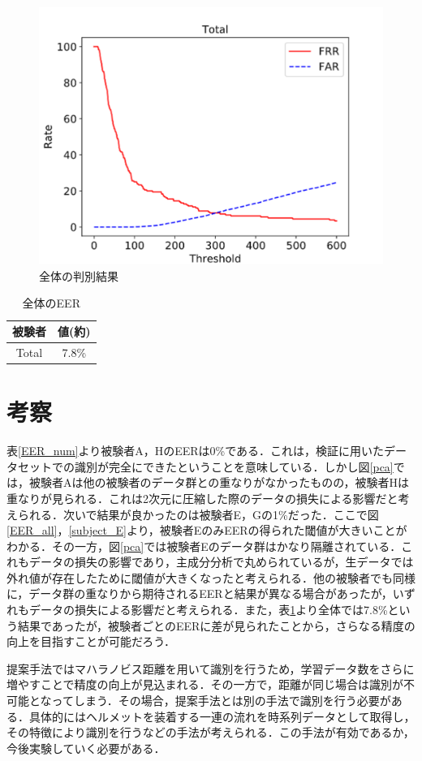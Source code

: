 \documentclass[Japanese]{dicomopapers}
\begin{document}
\begin{figure}[!t]
  \begin{center}
    \includegraphics[width=1\linewidth]{figure/EER_total.eps}
  \end{center}
    \vspace{-8mm}
  \caption{全体の判別結果}
  \label{EER_total}
\end{figure}

\begin{table}[htb]
  \center
  \begin{tabular}{|c|c|} \hline
    被験者 & 値(約) \\ \hline
    Total & 7.8\% \\ \hline
  \end{tabular}
  \caption{全体のEER}
  \label{EER_num_total}
\end{table}

\section{考察}
表\ref{EER_num}より被験者A，HのEERは0\%である．これは，検証に用いたデータセットでの識別が完全にできたということを意味している．しかし図\ref{pca}では，被験者Aは他の被験者のデータ群との重なりがなかったものの，被験者Hは重なりが見られる．これは2次元に圧縮した際のデータの損失による影響だと考えられる．次いで結果が良かったのは被験者E，Gの1\%だった．ここで図\ref{EER_all}，\ref{subject_E}より，被験者EのみEERの得られた閾値が大きいことがわかる．その一方，図\ref{pca}では被験者Eのデータ群はかなり隔離されている．これもデータの損失の影響であり，主成分分析で丸められているが，生データでは外れ値が存在したために閾値が大きくなったと考えられる．他の被験者でも同様に，データ群の重なりから期待されるEERと結果が異なる場合があったが，いずれもデータの損失による影響だと考えられる．また，表\ref{EER_num_total}より全体では7.8\%という結果であったが，被験者ごとのEERに差が見られたことから，さらなる精度の向上を目指すことが可能だろう．\par
提案手法ではマハラノビス距離を用いて識別を行うため，学習データ数をさらに増やすことで精度の向上が見込まれる．その一方で，距離が同じ場合は識別が不可能となってしまう．その場合，提案手法とは別の手法で識別を行う必要がある．具体的にはヘルメットを装着する一連の流れを時系列データとして取得し，その特徴により識別を行うなどの手法が考えられる．この手法が有効であるか，今後実験していく必要がある．
\end{document}
